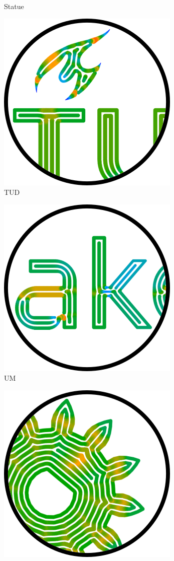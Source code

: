 \begin{figure}
\begin{subfigure}{\figwidth}
\caption{Statue}\label{applications_statue}
\end{subfigure}
\begin{subfigure}{\figwidth}\centering
\includegraphics[height=\figheight]{sources/applications/tud_logo.png}
\caption{TUD}\label{applications_tud}
\end{subfigure}
\begin{subfigure}{\figwidth}\centering
\includegraphics[height=\figheight]{sources/applications/ultimaker_logo.png}
\caption{UM}\label{applications_um}
\end{subfigure}
\begin{subfigure}{\figwidth}\centering
\includegraphics[height=\figheight]{sources/applications/pinion_gear_motor.png}

\end{subfigure}
\end{figure}

